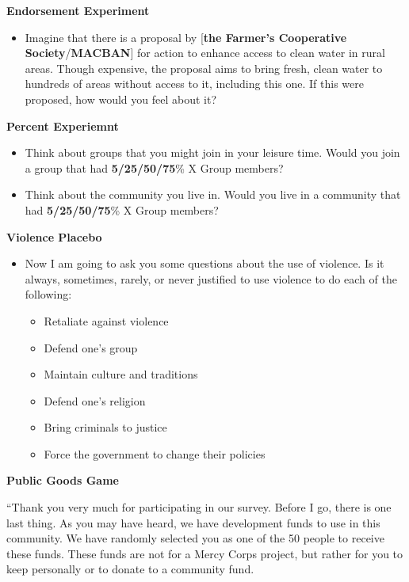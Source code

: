 \documentclass[
]{article}
\providecommand{\tightlist}{%
  \setlength{\itemsep}{0pt}\setlength{\parskip}{0pt}}
\begin{document}
\textbf{Endorsement Experiment}

\begin{itemize}
\tightlist
\item
  Imagine that there is a proposal by {[}\textbf{the Farmer's
  Cooperative Society}/\textbf{MACBAN}{]} for action to enhance access
  to clean water in rural areas. Though expensive, the proposal aims to
  bring fresh, clean water to hundreds of areas without access to it,
  including this one. If this were proposed, how would you feel about
  it?
\end{itemize}

\textbf{Percent Experiemnt}

\begin{itemize}
\tightlist
\item
  Think about groups that you might join in your leisure time. Would you
  join a group that had \textbf{5/25/50/75}\% X Group members?
\item
  Think about the community you live in. Would you live in a community
  that had \textbf{5/25/50/75}\% X Group members?
\end{itemize}

\textbf{Violence Placebo}

\begin{itemize}
\tightlist
\item
  Now I am going to ask you some questions about the use of violence. Is
  it always, sometimes, rarely, or never justified to use violence to do
  each of the following:

  \begin{itemize}
  \tightlist
  \item
    Retaliate against violence
  \item
    Defend one's group
  \item
    Maintain culture and traditions
  \item
    Defend one's religion
  \item
    Bring criminals to justice
  \item
    Force the government to change their policies
  \end{itemize}
\end{itemize}

\textbf{Public Goods Game}

``Thank you very much for participating in our survey. Before I go,
there is one last thing. As you may have heard, we have development
funds to use in this community. We have randomly selected you as one of
the 50 people to receive these funds. These funds are not for a Mercy
Corps project, but rather for you to keep personally or to donate to a
community fund.
\end{document}
